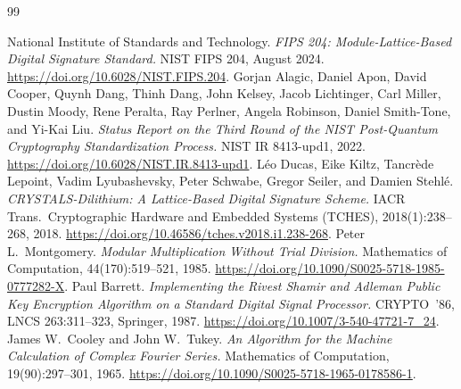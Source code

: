 \documentclass[journal=tches,submission,review]{iacrtrans}
\begin{document}
\begin{thebibliography}{99}

 National Institute of Standards and Technology.
  \emph{FIPS 204: Module-Lattice-Based Digital Signature Standard.} NIST FIPS 204, August 2024.
  \url{https://doi.org/10.6028/NIST.FIPS.204}.
 Gorjan Alagic, Daniel Apon, David Cooper, Quynh Dang, Thinh Dang, John Kelsey,
  Jacob Lichtinger, Carl Miller, Dustin Moody, Rene Peralta, Ray Perlner, Angela Robinson,
  Daniel Smith-Tone, and Yi-Kai Liu. \emph{Status Report on the Third Round of the NIST Post-Quantum
  Cryptography Standardization Process.} NIST IR 8413-upd1, 2022.
  \url{https://doi.org/10.6028/NIST.IR.8413-upd1}.
 L\'eo Ducas, Eike Kiltz, Tancr\`ede Lepoint, Vadim Lyubashevsky, Peter Schwabe,
  Gregor Seiler, and Damien Stehl\'e. \emph{CRYSTALS-Dilithium: A Lattice-Based Digital Signature
  Scheme.} IACR Trans.\ Cryptographic Hardware and Embedded Systems (TCHES), 2018(1):238--268, 2018.
  \url{https://doi.org/10.46586/tches.v2018.i1.238-268}.
 Peter L.\ Montgomery. \emph{Modular Multiplication Without Trial Division.}
  Mathematics of Computation, 44(170):519--521, 1985.
  \url{https://doi.org/10.1090/S0025-5718-1985-0777282-X}.
 Paul Barrett. \emph{Implementing the Rivest Shamir and Adleman Public Key
  Encryption Algorithm on a Standard Digital Signal Processor.} CRYPTO~'86, LNCS 263:311--323,
  Springer, 1987. \url{https://doi.org/10.1007/3-540-47721-7_24}.
 James W.\ Cooley and John W.\ Tukey. \emph{An Algorithm for the Machine
  Calculation of Complex Fourier Series.} Mathematics of Computation, 19(90):297--301, 1965.
  \url{https://doi.org/10.1090/S0025-5718-1965-0178586-1}.


\end{thebibliography}
\end{document}
